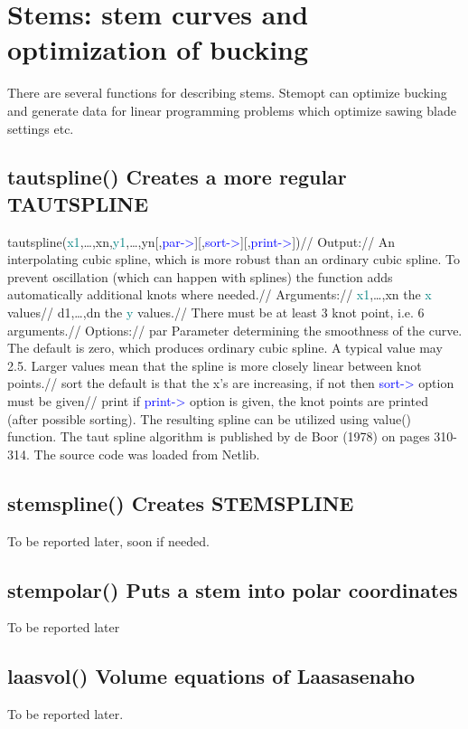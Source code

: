 \section{Stems: stem curves and optimization of bucking} 
\label{spline} 
There are several functions for describing stems. Stemopt can optimize bucking 
and generate data for linear programming problems which optimize sawing blade settings etc. 
\subsection{\textcolor{VioletRed}{tautspline}() Creates a more regular TAUTSPLINE} 
\label{tautspline} 
\textcolor{VioletRed}{tautspline}(\textcolor{teal}{x1},…,xn,\textcolor{teal}{y1},…,yn[,\textcolor{blue}{par->}][,\textcolor{blue}{sort->}][,\textcolor{blue}{print->}])// 
Output:// 
An interpolating cubic spline, which is more robust than an ordinary cubic spline. To prevent 
oscillation (which can happen with splines) the function adds automatically additional knots 
where needed.// 
Arguments:// 
\textcolor{teal}{x1},…,xn the \textcolor{teal}{x} values// 
d1,…,dn the \textcolor{teal}{y} values.// 
There must be at least 3 knot point, i.e. 6 arguments.// 
Options:// 
par Parameter determining the smoothness of the curve. The default is zero, 
which produces ordinary cubic spline. A typical value may 2.5. Larger values mean 
that the spline is more closely linear between knot points.// 
sort the default is that the x’s are increasing, if not then \textcolor{blue}{sort->} option must be given// 
print if \textcolor{blue}{print->} option is given, the knot points are printed (after possible sorting). 
The resulting spline can be utilized using \textcolor{VioletRed}{value}() function. 
The taut spline algorithm is published by de Boor (1978) on pages 310-314. The source code 
was loaded from Netlib. 
\subsection{\textcolor{VioletRed}{stemspline}() Creates STEMSPLINE} 
\label{stemspline} 
To be reported later, soon if needed. 
\subsection{\textcolor{VioletRed}{stempolar}() Puts a stem into polar coordinates} 
\label{stempolar} 
To be reported later 
\subsection{\textcolor{VioletRed}{laasvol}() Volume equations of Laasasenaho} 
\label{laasvol} 
To be reported later. 
